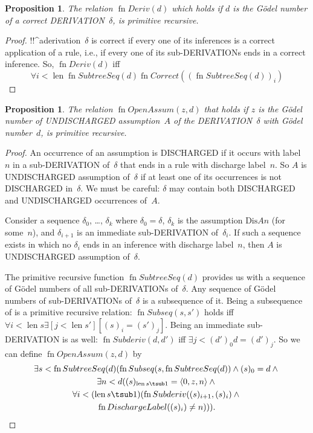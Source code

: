 \documentclass[10pt,a4paper]{article}
\newcommand*{\olup}[1]{\MakeUppercase{#1}}
\theoremstyle{plain}
\newtheorem{prop}[thm]{Proposition}
\theoremstyle{definition}
\theoremstyle{remark}
\newcommand*{\ollabel}[1]{\label{#1}}
\providecommand{\lexists}{\mathord{\exists}}
\providecommand{\tuple}[1]{\langle #1 \rangle}
\providecommand{\len}{\operatorname{len}}
\providecommand{\bforall}{\forall}
\providecommand{\bexists}{\exists}
\providecommand{\Discharge}{\mathrm{Dis}}
\providecommand{\fn}{\operatorname{fn}}
\begin{document}
\begin{prop}
  \ollabel{prop:deriv}
  The relation $\fn{Deriv}(d)$ which holds if $d$ is the G\"odel
  number of a correct \olup{derivation}~$\delta$, is primitive recursive.
\end{prop}

\begin{proof}
  !!^a{derivation}~$\delta$ is correct if every one of its inferences
  is a correct application of a rule, i.e., if every one of its
  sub-\olup{derivation}s ends in a correct inference. So, $\fn{Deriv}(d)$
  iff
  \[
  \bforall{i<\len{\fn{SubtreeSeq}(d)}}{\fn{Correct}((\fn{SubtreeSeq}(d))_i)}
  \]
\end{proof}

\begin{prop}
  \ollabel{prop:openassum} The relation $\fn{OpenAssum}(z, d)$ that
  holds if $z$ is the G\"odel number of \olup{undischarged} assumption~$A$
  of the \olup{derivation}~$\delta$ with G\"odel number~$d$, is primitive
  recursive.
\end{prop}

\begin{proof}
  An occurrence of an assumption is \olup{discharged} if it occurs with
  label~$n$ in a sub-\olup{derivation} of~$\delta$ that ends in a rule
  with discharge label~$n$. So $A$ is \olup{undischarged} assumption
  of~$\delta$ if at least one of its occurrences is not \olup{discharged}
  in~$\delta$. We must be careful: $\delta$ may contain both
  \olup{discharged} and \olup{undischarged} occurrences of~$A$.

  Consider a sequence $\delta_0$, \dots, $\delta_k$ where $\delta_0 =
  \delta$, $\delta_k$ is the assumption $\Discharge{A}{n}$
  (for some~$n$), and $\delta_{i+1}$ is an immediate sub-\olup{derivation}
  of~$\delta_i$. If such a sequence exists in which no $\delta_i$
  ends in an inference with discharge label~$n$, then $A$ is
  \olup{undischarged} assumption of~$\delta$.

  The primitive recursive function $\fn{SubtreeSeq}(d)$ provides us
  with a sequence of G\"odel numbers of all sub-\olup{derivation}s
  of~$\delta$. Any sequence of G\"odel numbers of sub-\olup{derivation}s
  of~$\delta$ is a subsequence of it. Being a subsequence of is a
  primitive recursive relation: $\fn{Subseq}(s, s')$ holds iff
  $\bforall{i<\len{s}}{\lexists[j<\len{s'}][(s)_i = (s')_j]}$. Being an
  immediate sub-\olup{derivation} is as well: $\fn{Subderiv}(d, d')$ iff
  $\bexists{j<(d')_0}{d = (d')_j}$. So we can define
  $\fn{OpenAssum}(z, d)$ by
  \begin{multline*}
    \bexists{s<\fn{SubtreeSeq}(d)}{(\fn{Subseq}(s, \fn{SubtreeSeq}(d))
      \land (s)_0 = d \land {}} \\
    \bexists{n<d}{((s)_{\len{s} \tsub 1} = \tuple{0, z, n} \land {}}\\
      \bforall{i<(\len{s} \tsub 1)}{(\fn{Subderiv}((s)_{i+1}, (s)_i) \land {}}\\
      \fn{DischargeLabel}((s)_i) \neq n))).
  \end{multline*}
\end{proof}
\end{document}
